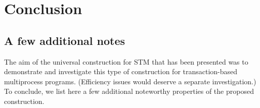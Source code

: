 

\section{Conclusion}
\label{sec:conclusion}



\subsection{A few additional notes}
\label{sec:discussion} 

The aim of the universal construction for STM that has been presented 
was to demonstrate and investigate this type of construction for
transaction-based multiprocess programs. (Efficiency issues 
would deserve  a separate investigation.) To  conclude, we list  here a few
additional noteworthy properties of the proposed  construction. 

